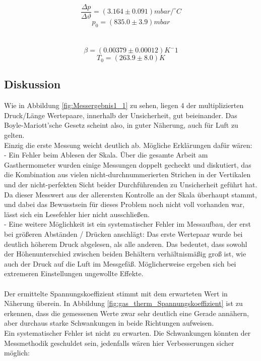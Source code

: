 \documentclass[12pt,a4paper]{article}
\begin{document}
\begin{multicols}{2}



$$\frac{\Delta p}{\Delta \vartheta} = (3.164 \pm 0.091) mbar/ ^\circ C$$
$$ p_0 = (835.0 \pm 3.9) mbar$$\\
\\
$$\beta = (0.00379 \pm 0.00012) K^-1$$
$$T_0 =(263.9 \pm 8.0)K$$



\subsection{Diskussion}

Wie in Abbildung \ref{fig:Messergebnis1_1} zu sehen, liegen 4 der multiplizierten Druck/Länge Wertepaare, innerhalb der Unsicherheit, gut beieinander. Das Boyle-Mariott'sche Gesetz scheint also, in guter Näherung, auch für Luft zu gelten.\\
Einzig die erste Messung weicht deutlich ab. Mögliche Erklärungen dafür wären:\\
\indent - Ein Fehler beim Ablesen der Skala. Über die gesamte Arbeit am Gasthermometer wurden einige Messungen doppelt gecheckt und diskutiert, das die Kombination aus vielen nicht-durchnummerierten Strichen in der Vertikalen und der nicht-perfekten Sicht beider Durchführenden zu Unsicherheit geführt hat.\\
Da dieser Messwert aus der allerersten Kontrolle an der Skala überhaupt stammt, und dabei das Bewusstsein für dieses Problem noch nicht voll vorhanden war,  lässt sich ein Lesefehler hier nicht ausschließen.\\
\indent - Eine weitere Möglichkeit ist ein systematischer Fehler im Messaufbau, der erst bei größeren Abständen / Drücken anschlägt: Das erste Wertepaar wurde bei deutlich höherem Druck abgelesen, als alle anderen. Das bedeutet, dass sowohl der Höhenunterschied zwischen beiden Behältern verhältnismäßig groß ist, wie auch der Druck auf die Luft im Messgefäß. Möglicherweise ergeben sich bei extremeren Einstellungen ungewollte Effekte.\\
\\
Der ermittelte Spannungskoeffizient stimmt mit dem erwarteten Wert in Näherung überein. In Abbildung \ref{fig:gas_therm_Spannungskoeffizient} ist zu erkennen, dass die gemessenen Werte zwar sehr deutlich eine Gerade annähern, aber durchaus starke Schwankungen in beide Richtungen aufweisen.\\
Ein systematischer Fehler ist nicht zu erwarten. Die Schwankungen könnten der Messmethodik geschuldet sein, jedenfalls wären hier Verbesserungen sicher möglich:\\

\end{multicols}
\end{document}
